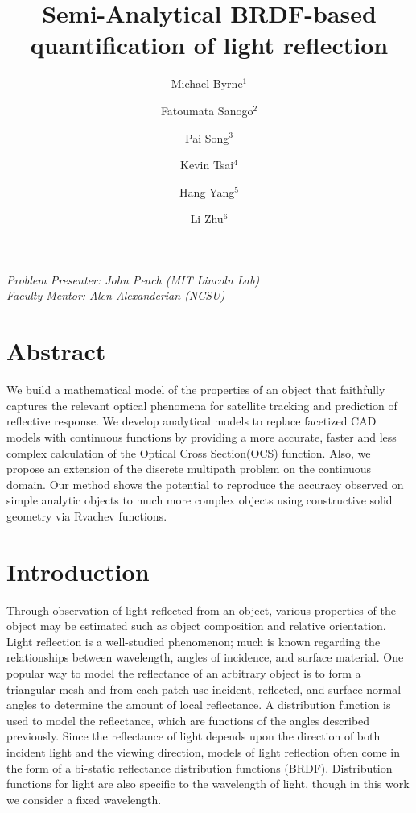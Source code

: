 \documentclass[11pt,reqno]{amsart}
\author{Michael Byrne$^1$}
\author{Fatoumata Sanogo$^2$}
\author{Pai Song$^3$}
\author{Kevin Tsai$^4$}
\author{Hang Yang$^5$}
\author{Li Zhu$^6$}
\title{Semi-Analytical BRDF-based quantification of light reflection}
\theoremstyle{definition}
\begin{document}
\maketitle
{\noindent
\textit{Problem Presenter:  John Peach (MIT Lincoln Lab)\\
Faculty Mentor: Alen Alexanderian (NCSU)}}

\tableofcontents

\section{Abstract}

We build a mathematical model of the properties of an object that faithfully
captures the relevant optical phenomena for satellite tracking and prediction
of reflective response. We develop analytical models to replace facetized CAD
models with continuous functions by providing a more accurate, faster and less
complex calculation of the Optical Cross Section(OCS) function. Also, we
propose an extension of the discrete multipath problem on the continuous
domain. Our method shows the potential to reproduce the accuracy observed on
simple analytic objects to much more complex objects using constructive solid
geometry via Rvachev functions.

\section{Introduction}
Through observation of light reflected from an object, various properties of the object may be estimated such as object composition and relative orientation. 
Light reflection is a well-studied phenomenon; much is known regarding the relationships between wavelength, angles of incidence, and surface material. 
One popular way to model the reflectance of an arbitrary object is to form a triangular mesh and from each patch use incident, reflected, and surface normal angles to determine the amount of local reflectance. 
A distribution function is used to model the reflectance, which are functions of the angles described previously. 
Since the reflectance of light depends upon the direction of both incident light and the viewing direction, models of light reflection often come in the form of a bi-static reflectance distribution functions (BRDF). 
Distribution functions for light are also specific to the wavelength of light, though in this 
work we consider a fixed wavelength. 
\end{document}
